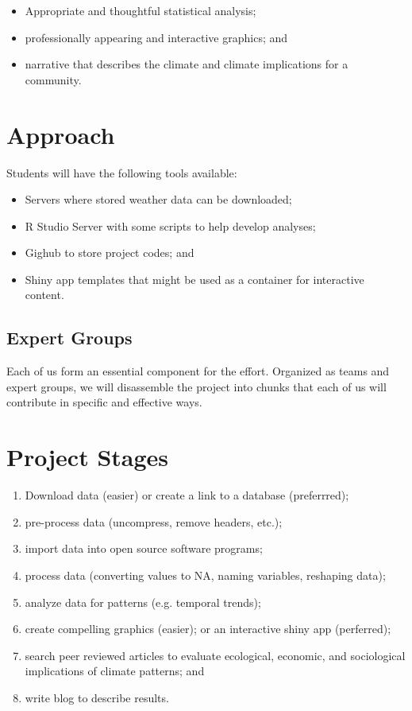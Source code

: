 \documentclass{article}\usepackage[]{graphicx}\usepackage[]{color}
\begin{document}
\begin{itemize}
  \item Appropriate and thoughtful statistical analysis;
  \item professionally appearing and interactive graphics; and 
  \item narrative that describes the climate and climate implications for a community.
\end{itemize}

\section{Approach}

Students will have the following tools available:

\begin{itemize}
  \item Servers where stored weather data can be downloaded;
  \item R Studio Server with some scripts to help develop analyses;
  \item Gighub to store project codes; and
  \item Shiny app templates that might be used as a container for interactive content.
\end{itemize}

\subsection{Expert Groups}

Each of us form an essential component for the effort. Organized as teams and expert groups, we will disassemble the project into chunks that each of us will contribute in specific and effective ways. 


\section{Project Stages}

\begin{enumerate}
  \item Download data (easier) or create a link to a database (preferrred);
  \item pre-process data (uncompress, remove headers, etc.);
  \item import data into open source software programs;
  \item process data (converting values to NA, naming variables, reshaping data);
  \item analyze data for patterns (e.g. temporal trends);
  \item create compelling graphics (easier); or an interactive shiny app (perferred);
  \item search peer reviewed articles to evaluate ecological, economic, and sociological implications of climate patterns; and
  \item write blog to describe results. 
\end{enumerate}
\end{document}
